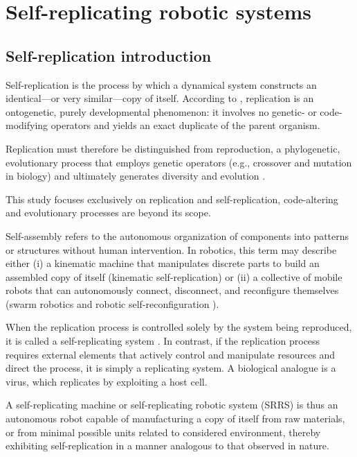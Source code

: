 \section {Self-replicating robotic systems}

\subsection{Self-replication introduction}

Self-replication is the process by which a dynamical system constructs an identical—or 
very similar—copy of itself. According to \citeauthor{Sipper1998SelfReplication}, 
replication is an ontogenetic, purely developmental phenomenon: it involves 
no genetic- or code-modifying operators and yields an exact duplicate of the parent organism. 

Replication must therefore be distinguished from reproduction, a phylogenetic,
evolutionary process that employs genetic operators (e.g., crossover and mutation in biology) 
and ultimately generates diversity and evolution \cite{Sipper1998SelfReplication}. 

This study focuses exclusively on replication and self-replication,
code-altering and evolutionary processes are beyond its scope.

Self-assembly refers to the autonomous organization of components into patterns 
or structures without human intervention. 
In robotics, this term may describe either 
(i) a kinematic machine that manipulates discrete parts to build 
an assembled copy of itself (kinematic self-replication) or 
(ii) a collective of mobile robots that can autonomously connect, 
disconnect, and reconfigure themselves 
(swarm robotics and robotic self-reconfiguration \cite{Tan2020Framework}).

When the replication process is controlled solely by the system being reproduced, 
it is called a self-replicating system \cite{Lee2007Robotic}.
In contrast, if the replication process requires external elements that actively control
and manipulate resources and direct the process, it is simply a replicating system. 
A biological analogue is a virus, which replicates by exploiting a host cell.

A self-replicating machine or self-replicating robotic system (SRRS) 
is thus an autonomous robot capable of manufacturing 
a copy of itself from raw materials, or from minimal possible units related to 
considered environment, thereby exhibiting self-replication in a manner 
analogous to that observed in nature.

